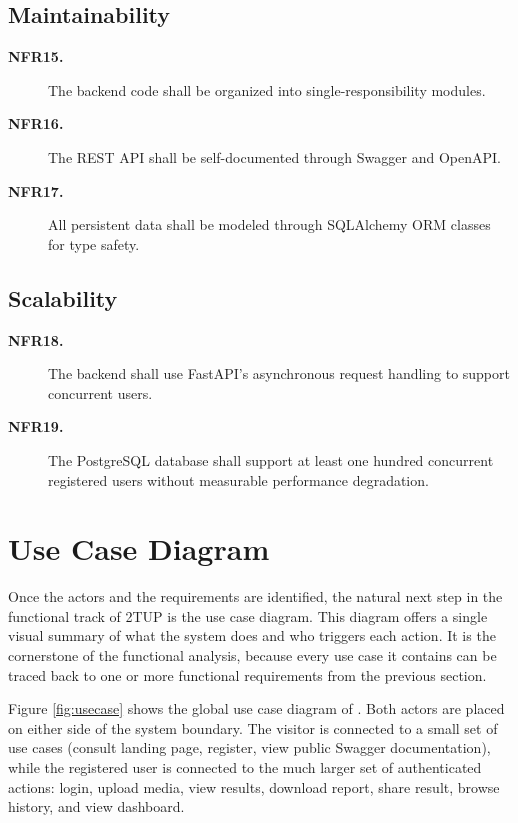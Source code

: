 \subsection*{Maintainability}
\begin{description}
\item[\textbf{NFR15.}] The backend code shall be organized into single-responsibility modules.
\item[\textbf{NFR16.}] The REST API shall be self-documented through Swagger and OpenAPI.
\item[\textbf{NFR17.}] All persistent data shall be modeled through SQLAlchemy ORM classes for type safety.
\end{description}

\subsection*{Scalability}
\begin{description}
\item[\textbf{NFR18.}] The backend shall use FastAPI's asynchronous request handling to support concurrent users.
\item[\textbf{NFR19.}] The PostgreSQL database shall support at least one hundred concurrent registered users without measurable performance degradation.
\end{description}

\section{Use Case Diagram}

Once the actors and the requirements are identified, the natural next step in the functional track of 2TUP is the use case diagram. This diagram offers a single visual summary of what the system does and who triggers each action. It is the cornerstone of the functional analysis, because every use case it contains can be traced back to one or more functional requirements from the previous section.

Figure \ref{fig:usecase} shows the global use case diagram of \deepguard{}. Both actors are placed on either side of the system boundary. The visitor is connected to a small set of use cases (consult landing page, register, view public Swagger documentation), while the registered user is connected to the much larger set of authenticated actions: login, upload media, view results, download report, share result, browse history, and view dashboard.

